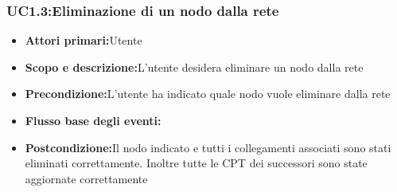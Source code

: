 \subsubsection{UC1.3:Eliminazione di un nodo dalla rete}
\begin{itemize}
	\item{\textbf{Attori primari:}Utente}
	\item{\textbf{Scopo e descrizione:}L'utente desidera eliminare un nodo dalla rete}
	\item{\textbf{Precondizione:}L'utente ha indicato quale nodo vuole eliminare dalla rete}
	\item{\textbf{Flusso base degli eventi:}}			
	\item{\textbf{Postcondizione:}Il nodo indicato e tutti i collegamenti associati sono stati eliminati correttamente. Inoltre tutte le CPT dei successori sono state aggiornate correttamente}
\end{itemize}

